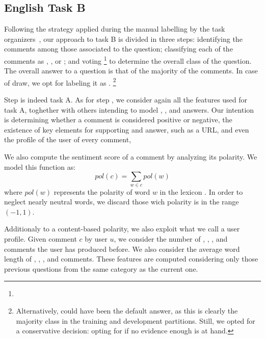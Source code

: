 
\subsection{English Task B}
\label{sub:app_enB}

Following the strategy applied during the manual labelling by the task 
organizers~, our approach to task B is divided in three steps:
\Ni identifying the \good comments among those associated to the question;
\Nii classifying each of the \good comments as \yes, \no, or \unsure; and 
\Niii voting%
\footnote{} to determine 
the overall class of the question. The overall answer to a question is that of 
the majority of the comments. In case of draw, we opt for labeling it as 
\unsure.%
\footnote{Alternatively, \yes could have been the default answer, as this is 
clearly the majority class in the training and development partitions. Still, 
we opted for a conservative decision: opting for \unsure if no evidence enough 
is at hand.}

Step \Ni is indeed task A. As for step \Nii, we consider again all the 
features used  for task A, toghether with others intending to model \yes, 
\no, and \unsure answers. Our intention is determining whether a comment is 
considered positive or negative, the existence of key elements for supporting 
and answer, such as a URL, and even the profile of the user of every comment, 

We also compute the sentiment score of a comment by analyzing its polarity. We 
model this function as:
\begin{equation}
pol(c) = \sum_{w\in c} pol(w) 
\end{equation}
%
where $pol(w)$ represents the polarity of word $w$ in the lexicon 
. In order to neglect nearly neutral words, we discard those 
wich polarity is in the range $(-1,1)$. 


Additionaly to a content-based polarity, we also exploit what we call a user 
profile. Given comment $c$ by user $u$, we consider the number of 
\good, \bad, \pot, and \dial comments the user has produced before. We also 
consider the average word length of \good, \bad, \pot, and \dial comments.
These features are computed considering only those previous questions from 
the same category as the current one. 


